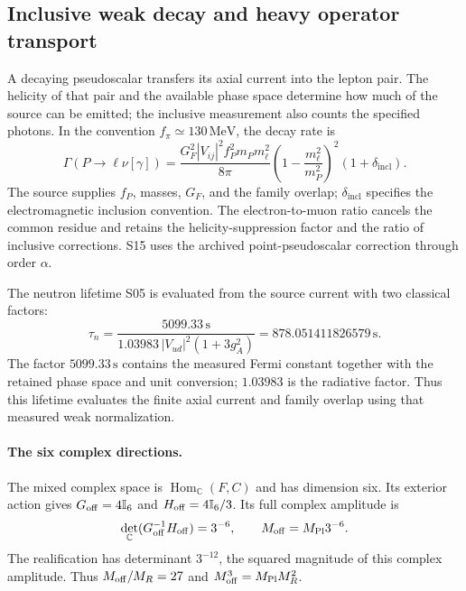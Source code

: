 \documentclass[aps,prx,onecolumn,10pt,notitlepage,nofootinbib,longbibliography]{revtex4-2}
\numberwithin{equation}{section}
\numberwithin{table}{section}
\newcommand{\Id}{\mathbb I}
\newcommand{\CC}{\mathbb C}
\newcommand{\MeV}{\,\mathrm{MeV}}
\begin{document}
\subsection{Inclusive weak decay and heavy operator transport}
A decaying pseudoscalar transfers its axial current into the lepton pair. The helicity of that pair and the available phase space determine how much of the source can be emitted; the inclusive measurement also counts the specified photons. In the convention $f_\pi\simeq130\MeV$, the decay rate is
\begin{equation}
 \Gamma(P\to\ell\nu[\gamma])
 =\frac{G_F^2|V_{ij}|^2f_P^2m_Pm_\ell^2}{8\pi}
 \left(1-\frac{m_\ell^2}{m_P^2}\right)^2(1+\delta_{\mathrm{incl}}).
\end{equation}
The source supplies $f_P$, masses, $G_F$, and the family overlap; $\delta_{\mathrm{incl}}$ specifies the electromagnetic inclusion convention. The electron-to-muon ratio cancels the common residue and retains the helicity-suppression factor and the ratio of inclusive corrections. S15 uses the archived point-pseudoscalar correction through order $\alpha$.

The neutron lifetime S05 is evaluated from the source current with two classical factors:
\begin{equation}
 \tau_n=\frac{5099.33\,\mathrm s}
 {1.03983\,|V_{ud}|^2(1+3g_A^2)}
 =878.051411826579\,\mathrm s.
 \label{eq:neutronlife}
\end{equation}
The factor $5099.33\,\mathrm s$ contains the measured Fermi constant together with the retained phase space and unit conversion; $1.03983$ is the radiative factor. Thus this lifetime evaluates the finite axial current and family overlap using that measured weak normalization.

\paragraph*{The six complex directions.}
The mixed complex space is $\operatorname{Hom}_{\CC}(F,C)$ and has dimension
six. Its exterior action gives $G_{\rm off}=4\Id_6$ and
$H_{\rm off}=4\Id_6/3$. Its full complex amplitude is
\begin{equation}
 \det_{\CC}(G_{\rm off}^{-1}H_{\rm off})=3^{-6},\qquad
 M_{\rm off}=M_{\rm Pl}3^{-6}.
 \label{eq:offdiagonaldeterminant}
\end{equation}
The realification has determinant $3^{-12}$, the squared magnitude of this
complex amplitude. Thus $M_{\rm off}/M_R=27$ and
$M_{\rm off}^3=M_{\rm Pl}M_R^2$.
\end{document}
